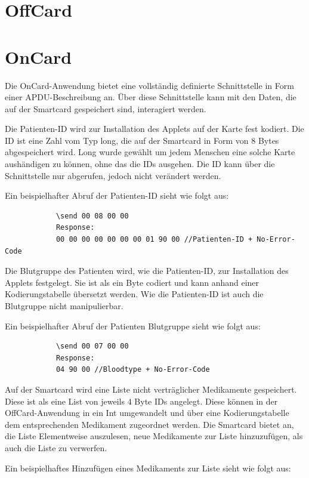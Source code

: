 \documentclass[parskip]{scrartcl}
\begin{document}
	\section{OffCard}
	\section{OnCard}
		Die OnCard-Anwendung bietet eine vollständig definierte Schnittstelle in Form einer APDU-Beschreibung an. Über diese Schnittstelle kann mit den Daten, die auf der Smartcard gespeichert sind, interagiert werden.
		
		Die Patienten-ID wird zur Installation des Applets auf der Karte fest kodiert. Die ID ist eine Zahl vom Typ long, die auf der Smartcard in Form von 8 Bytes abgespeichert wird. Long wurde gewählt um jedem Menschen eine solche Karte aushändigen zu können, ohne das die IDs ausgehen. Die ID kann über die Schnittstelle nur abgerufen, jedoch nicht verändert werden.
		
		Ein beispielhafter Abruf der Patienten-ID sieht wie folgt aus:
		
		\begin{lstlisting}
			\send 00 08 00 00
			Response:
			00 00 00 00 00 00 00 01 90 00 //Patienten-ID + No-Error-Code
		\end{lstlisting}
		
		Die Blutgruppe des Patienten wird, wie die Patienten-ID, zur Installation des Applets festgelegt. Sie ist als ein Byte codiert und kann anhand einer Kodierungstabelle übersetzt werden. Wie die Patienten-ID ist auch die Blutgruppe nicht manipulierbar.
		
		Ein beispielhafter Abruf der Patienten Blutgruppe sieht wie folgt aus:
		
		\begin{lstlisting}
			\send 00 07 00 00
			Response:
			04 90 00 //Bloodtype + No-Error-Code
		\end{lstlisting}
		
		Auf der Smartcard wird eine Liste nicht verträglicher Medikamente gespeichert. Diese ist als eine List von jeweils 4 Byte IDs angelegt. Diese können in der OffCard-Anwendung in ein Int umgewandelt und über eine Kodierungstabelle dem entsprechenden Medikament zugeordnet werden. Die Smartcard bietet an, die Liste Elementweise auszulesen, neue Medikamente zur Liste hinzuzufügen, als auch die Liste zu verwerfen.
		
		Ein beispielhaftes Hinzufügen eines Medikaments zur Liste sieht wie folgt aus:
		
\end{document}
